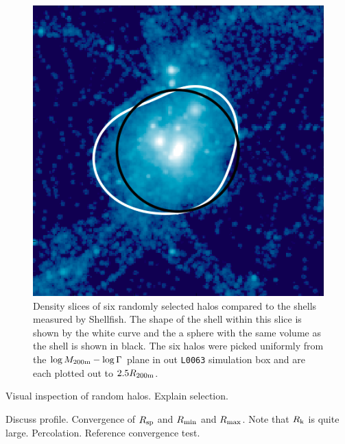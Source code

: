 \documentclass[numberedappendix,apj]{emulateapj}
\begin{document}
\begin{figure}
   \hspace{0.4cm}
   \includegraphics[width=0.7\columnwidth]{example_halos/pass_ex6.png}
   \caption{Density slices of six randomly selected halos compared to the
      shells measured by Shellfish. The shape of the shell within this slice
      is shown by the white curve and the a sphere with the same
      volume as the shell is shown in black. The six halos were picked uniformly
      from the $\log{M_{\rm 200m}}-\log{\Gamma}$ plane in out \texttt{L0063}
      simulation box and are each plotted out to $2.5 R_{\rm 200m}$.}
      \label{fig:pass_ex}
\end{figure}

Visual inspection of random halos. Explain selection.

Discuss profile. Convergence of $R_{\rm sp}$ and $R_{\rm min}$ and
$R_{\rm max}$.  Note that $R_{\rm k}$
is quite large. Percolation. Reference convergence test.
\end{document}

